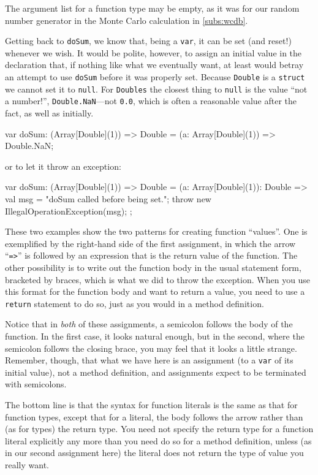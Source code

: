 The argument list for a function type may be empty, as it was for our random
number generator in the Monte Carlo calculation in \ref{subs:wcdb}.

Getting back to {\tt doSum}, we know that, being a {\tt var}, it can be set (and
reset!) whenever we wish. It would be polite, however, to assign an initial
value in the declaration that, if nothing like what we eventually want, at least
would betray an attempt to use {\tt doSum} before it was properly set.
Because {\tt Double} is a {\tt struct} we cannot set it to {\tt null}.
For {\tt Doubles} the closest thing to {\tt null} is the value ``not a number!'',
{\tt Double.NaN}---not {\tt 0.0}, which is often
a reasonable value after the fact, as well as initially.
\begin{xten}
 var doSum:    (Array[Double](1)) => Double
          = (a: Array[Double](1)) => Double.NaN;
\end{xten}
or to let it throw an exception:
\begin{xten}
 var doSum: (Array[Double](1)) => Double
       = (a: Array[Double](1)): Double => {
            val msg = "doSum called before being set.";
            throw new IllegalOperationException(msg);
          };
\end{xten}
These two examples show the two patterns for creating function ``values''.
One is exemplified by the right-hand side of the first assignment, in which
the arrow ``{\tt =>}'' is followed by an expression that is the return value of
the function.  The other possibility is to write out the function body in the
usual statement form, bracketed by braces, which is what we did to throw the
exception.  When you use this format for the function body and want to return a
value, you need to use a {\tt return} statement to do so, just as you would in
a method definition.

Notice that in {\em both} of these assignments, a semicolon follows the body of
the function.  In the first case, it looks natural enough, but in the second, where
the semicolon follows the closing brace, you may feel that it looks
a little strange.  Remember, though, that what we have here is an assignment
(to a {\tt var} of its initial value), not a method definition, 
and assignments expect to be terminated with semicolons.  

The bottom line is that the syntax for function literals is the same as that for
function types, except that for a literal, the body follows the arrow rather
than (as for types) the return type. You need not specify
the return type for a function literal explicitly any more than you need do so
for a method definition, unless (as in our second assignment here) the
literal does not return the type of value you really want.

